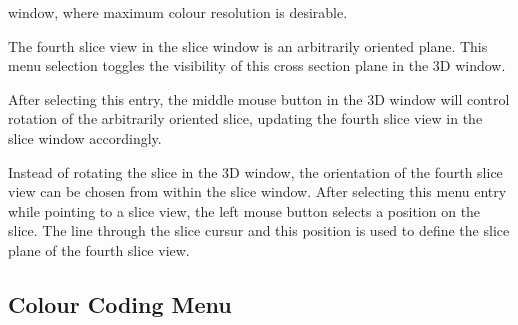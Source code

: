 \begin{description}
       window, where maximum colour resolution is desirable.
\item[\menutwo{Slice}{Toggle Plane Visib}]  The fourth slice view in
       the slice window is an arbitrarily oriented plane.  This menu
       selection toggles the visibility of this cross section plane in
       the 3D window.
\item[\menutwo{Slice}{Rotate Slice}]  After selecting this entry,
       the middle mouse button in the 3D window will control rotation
       of the arbitrarily oriented slice, updating the fourth slice
       view in the slice window accordingly.
\item[\menutwo{Slice}{Pick Slice Angle}]  Instead of rotating the
       slice in the 3D window, the orientation of the fourth slice
       view can be chosen from within the slice window.  After
       selecting this menu entry while pointing to a slice view, the left
       mouse button selects a position on the slice.  The line through
       the slice cursur and this position is used to define the slice
       plane of the fourth slice view.
\end{description}

\subsection{Colour Coding Menu}

